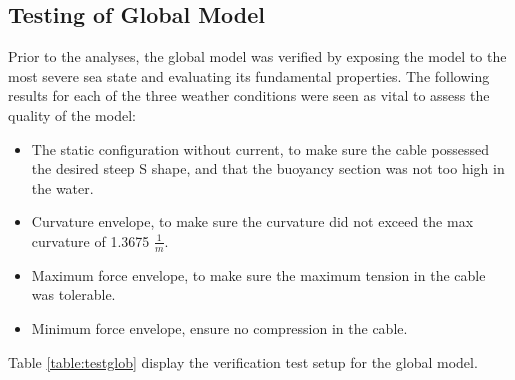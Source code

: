 \subsection{Testing of Global Model}
Prior to the analyses, the global model was verified by exposing the model to the most severe sea state and evaluating its fundamental properties. The following results for each of the three weather conditions were seen as vital to assess the quality of the model:
\begin{itemize}
    \item The static configuration without current, to make sure the cable possessed the desired steep S shape, and that the buoyancy section was not too high in the water.
    \item Curvature envelope, to make sure the curvature did not exceed the max curvature of 1.3675 $\frac{1}{m}$.
    \item Maximum force envelope, to make sure the maximum tension in the cable was tolerable.
    \item Minimum force envelope, ensure no compression in the cable.
\end{itemize}  Table \ref{table:testglob} display the verification test setup for the global model.

